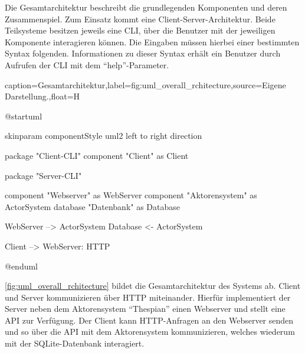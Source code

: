 Die Gesamtarchitektur beschreibt die grundlegenden Komponenten und deren Zusammenspiel.
Zum Einsatz kommt eine Client-Server-Architektur.
Beide Teilsysteme besitzen jeweils eine \ac{CLI}, über die Benutzer mit der jeweiligen Komponente interagieren können.
Die Eingaben müssen hierbei einer bestimmten Syntax folgenden.
Informationen zu dieser Syntax erhält ein Benutzer durch Aufrufen der \ac{CLI} mit dem \enquote{help}-Parameter.

\begin{dhbwfigure}{caption=Gesamtarchitektur,label=fig:uml_overall_rchitecture,source={Eigene Darstellung.},float=H}
    \begin{plantuml}
        @startuml

            skinparam componentStyle uml2
            left to right direction

            package "Client-CLI" {
                component "Client" as Client
            }

            package "Server-CLI" {
                component "Webserver" as WebServer
                component "Aktorensystem" as ActorSystem
                database "Datenbank" as Database

                WebServer --> ActorSystem
                Database <- ActorSystem
            }

            Client --> WebServer: HTTP

        @enduml
    \end{plantuml}
\end{dhbwfigure}

\autoref{fig:uml_overall_rchitecture} bildet die Gesamtarchitektur des Systems ab.
Client und Server kommunizieren über \ac{HTTP} miteinander.
Hierfür implementiert der Server neben dem Aktorensystem \enquote{Thespian} einen Webserver und stellt eine \ac{API} zur Verfügung. %
Der Client kann \ac{HTTP}-Anfragen an den Webserver senden und so über die \ac{API} mit dem Aktorensystem kommunizieren, welches wiederum mit der SQLite-Datenbank interagiert. %

